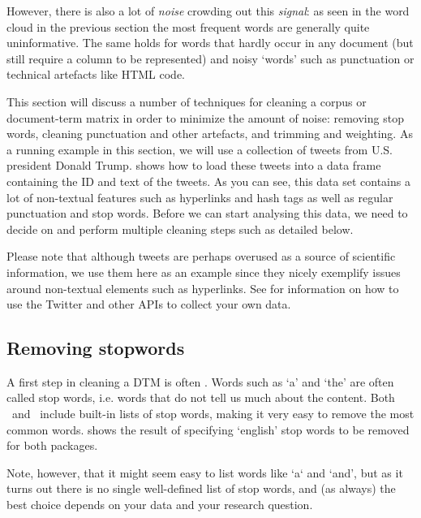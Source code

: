 However, there is also a lot of \emph{noise} crowding out this \emph{signal}:
as seen in the word cloud in the previous section the most frequent words are generally quite uninformative.
The same holds for words that hardly occur in any document (but still require a column to be represented)
and noisy `words' such as punctuation or technical artefacts like HTML code. 

This section will discuss a number of techniques for cleaning a corpus or document-term matrix in order to minimize the amount of noise: removing stop words, cleaning punctuation and other artefacts, and trimming and weighting.  
As a running example in this section, we will use a collection of tweets from U.S. president Donald Trump.
 shows how to load these tweets into a data frame containing the ID and text of the tweets.
As you can see, this data set contains a lot of non-textual features such as hyperlinks and hash tags as well as regular punctuation and stop words.
Before we can start analysing this data, we need to decide on and perform multiple cleaning steps such as detailed below. 


Please note that although tweets are perhaps overused as a source of scientific information,
we use them here as an example since they nicely exemplify issues around non-textual elements such as hyperlinks.
See  for information on how to use the Twitter and other APIs to collect your own data.

\subsection{Removing stopwords}

A first step in cleaning a DTM is often .
Words such as `a' and `the' are often called stop words, i.e. words that do not tell us much about the content.
Both \quanteda\ and \sklearn\ include built-in lists of stop words, making it very easy to remove the most common words.
 shows the result of specifying `english' stop words to be removed for both packages.




Note, however, that it might seem easy to list words like `a` and `and',
but as it turns out there is no single well-defined list of stop words,
and (as always) the best choice depends on your data and your research question.


